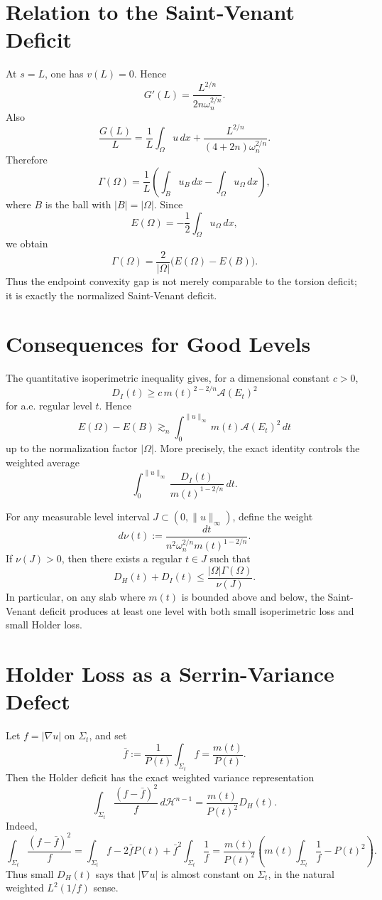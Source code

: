 \documentclass[11pt]{article}
\begin{document}
\section{Relation to the Saint-Venant Deficit}

At \(s=L\), one has \(v(L)=0\). Hence
\[
G'(L)=\frac{L^{2/n}}{2n\omega_n^{2/n}}.
\]
Also
\[
\frac{G(L)}{L}
=
\frac1L\int_\Omega u\,dx
+
\frac{L^{2/n}}{(4+2n)\omega_n^{2/n}}.
\]
Therefore
\[
\Gamma(\Omega)
=
\frac1L\left(\int_B u_B\,dx-\int_\Omega u_\Omega\,dx\right),
\]
where \(B\) is the ball with \(|B|=|\Omega|\). Since
\[
E(\Omega)=-\frac12\int_\Omega u_\Omega\,dx,
\]
we obtain
\[
\boxed{
\Gamma(\Omega)
=
\frac{2}{|\Omega|}
\big(E(\Omega)-E(B)\big).
}
\]
Thus the endpoint convexity gap is not merely comparable to the torsion
deficit; it is exactly the normalized Saint-Venant deficit.

\section{Consequences for Good Levels}

The quantitative isoperimetric inequality gives, for a dimensional constant
\(c>0\),
\[
D_I(t)
\ge
c\,m(t)^{2-2/n}\mathcal A(E_t)^2
\]
for a.e. regular level \(t\). Hence
\[
E(\Omega)-E(B)
\gtrsim_n
\int_0^{\|u\|_\infty}
m(t)\mathcal A(E_t)^2\,dt
\]
up to the normalization factor \(|\Omega|\). More precisely, the exact identity
controls the weighted average
\[
\int_0^{\|u\|_\infty}
\frac{D_I(t)}
{m(t)^{1-2/n}}\,dt.
\]

For any measurable level interval \(J\subset(0,\|u\|_\infty)\), define the
weight
\[
d\nu(t)
:=
\frac{dt}{n^2\omega_n^{2/n}m(t)^{1-2/n}}.
\]
If \(\nu(J)>0\), then there exists a regular \(t\in J\) such that
\[
D_H(t)+D_I(t)
\le
\frac{|\Omega|\Gamma(\Omega)}{\nu(J)}.
\]
In particular, on any slab where \(m(t)\) is bounded above and below, the
Saint-Venant deficit produces at least one level with both small isoperimetric
loss and small Holder loss.

\section{Holder Loss as a Serrin-Variance Defect}

Let \(f=|\nabla u|\) on \(\Sigma_t\), and set
\[
\bar f:=\frac1{P(t)}\int_{\Sigma_t}f
=
\frac{m(t)}{P(t)}.
\]
Then the Holder deficit has the exact weighted variance representation
\[
\boxed{
\int_{\Sigma_t}
\frac{(f-\bar f)^2}{f}\,d\mathcal H^{n-1}
=
\frac{m(t)}{P(t)^2}D_H(t).
}
\]
Indeed,
\[
\int_{\Sigma_t}\frac{(f-\bar f)^2}{f}
=
\int_{\Sigma_t}f
-2\bar f P(t)
+\bar f^2\int_{\Sigma_t}\frac1f
=
\frac{m(t)}{P(t)^2}
\left(
m(t)\int_{\Sigma_t}\frac1f-P(t)^2
\right).
\]
Thus small \(D_H(t)\) says that \(|\nabla u|\) is almost constant on
\(\Sigma_t\), in the natural weighted \(L^2(1/f)\) sense.
\end{document}
